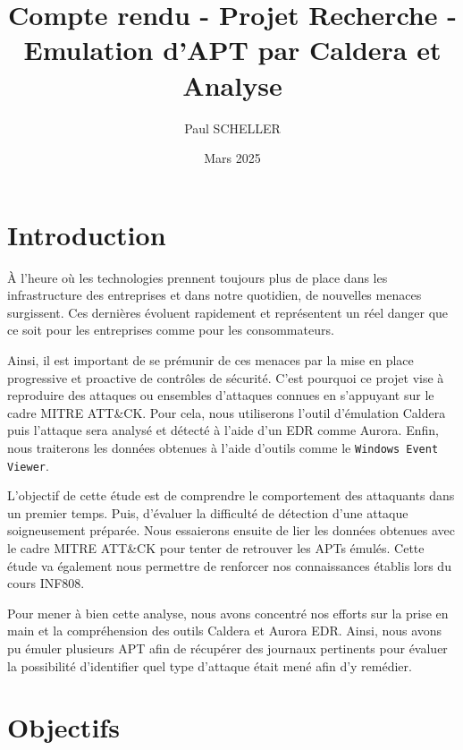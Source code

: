 \documentclass[12pt,letterpaper]{article}
\title{Compte rendu - Projet Recherche - Emulation d'APT par Caldera et Analyse}
\author{Paul SCHELLER}
\date{Mars 2025}
\begin{document}



\newpage
\renewcommand{\contentsname}{Plan de l'étude}
\tableofcontents


\newpage
\section{Introduction}

À l'heure où les technologies prennent toujours plus de place dans les infrastructure des entreprises et dans notre quotidien, de nouvelles menaces surgissent.
Ces dernières évoluent rapidement et représentent un réel danger que ce soit pour les entreprises comme pour les consommateurs.

\bigskip

Ainsi, il est important de se prémunir de ces menaces par la mise en place progressive et proactive de contrôles de sécurité.
C'est pourquoi ce projet vise à reproduire des attaques ou ensembles d'attaques connues en s'appuyant sur le cadre MITRE ATT\&CK.
Pour cela, nous utiliserons l'outil d'émulation Caldera puis l'attaque sera analysé et détecté à l'aide d'un EDR comme Aurora.
Enfin, nous traiterons les données obtenues à l'aide d'outils comme le \verb|Windows Event Viewer|.

\bigskip

L'objectif de cette étude est de comprendre le comportement des attaquants dans un premier temps.
Puis, d'évaluer la difficulté de détection d'une attaque soigneusement préparée.
Nous essaierons ensuite de lier les données obtenues avec le cadre MITRE ATT\&CK pour tenter de retrouver les APTs émulés.
Cette étude va également nous permettre de renforcer nos connaissances établis lors du cours INF808.

\bigskip

Pour mener à bien cette analyse, nous avons concentré nos efforts sur la prise en main et la compréhension des outils Caldera et Aurora EDR.
Ainsi, nous avons pu émuler plusieurs APT afin de récupérer des journaux pertinents pour évaluer la possibilité d'identifier quel type d'attaque était mené afin d'y remédier.

\newpage
\section{Objectifs}
\end{document}
